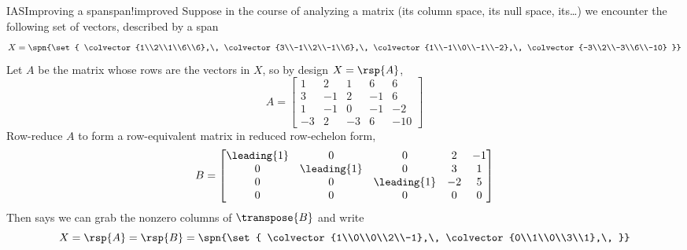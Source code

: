 \begin{example}{IAS}{Improving a span}{span!improved}
Suppose in the course of analyzing a matrix (its column space, its null space, its\dots) we encounter the following set of vectors, described by a span
%
\begin{equation*}
X=\spn{\set{
\colvector{1\\2\\1\\6\\6},\,
\colvector{3\\-1\\2\\-1\\6},\,
\colvector{1\\-1\\0\\-1\\-2},\,
\colvector{-3\\2\\-3\\6\\-10}
}}
\end{equation*}
%
Let $A$ be the matrix whose rows are the vectors in $X$, so by design $X=\rsp{A}$,
%
\begin{equation*}
A=
\begin{bmatrix}
1 & 2 & 1 & 6 & 6\\
3 & -1 & 2 & -1 & 6\\ 
1 & -1 & 0 & -1 & -2\\ 
-3 & 2 & -3 & 6 & -10
\end{bmatrix}
\end{equation*}
%
Row-reduce $A$ to form a row-equivalent matrix in reduced row-echelon form, 
%
\begin{equation*}
B=
\begin{bmatrix}
\leading{1} & 0 & 0 & 2 & -1\\
0 & \leading{1} & 0 & 3 & 1\\ 
0 & 0 & \leading{1} & -2 & 5\\ 
0 & 0 & 0 & 0 & 0
\end{bmatrix}
\end{equation*}
%
Then  says we can grab the nonzero columns of $\transpose{B}$ and write
%
\begin{equation*}
X=\rsp{A}=\rsp{B}=
\spn{\set{
\colvector{1\\0\\0\\2\\-1},\,
\colvector{0\\1\\0\\3\\1},\,
}}
\end{equation*}
\end{example}
